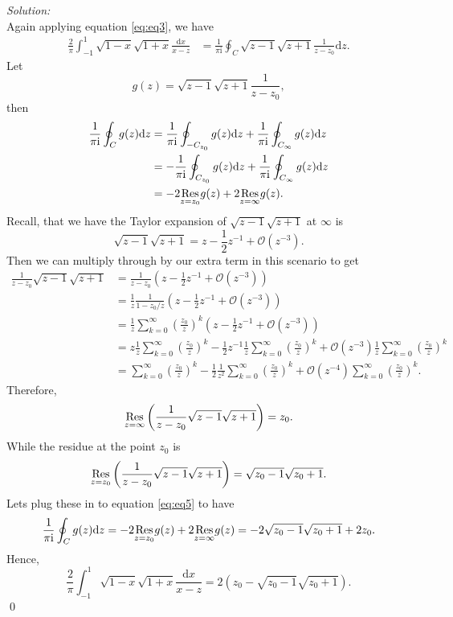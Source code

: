 \documentclass[10pt]{amsart}
\newcommand{\D}{\mathrm{d}}
\newcommand{\I}{\mathrm{i}}
\theoremstyle{nonumberplain}
\begin{document}
\begin{enumerate}[label={\bf {\arabic*}:}]
\begin{enumerate}
\textit{Solution:} \\
Again applying equation \eqref{eq:eq3}, we have
\begin{align*}
\frac{2}{\pi}\int_{-1}^1 {\sqrt{1-x} \sqrt{1 + x}} \frac{\D x}{x -z}
	&= \frac 1 {\pi \I} \oint_C \sqrt {z - 1} \sqrt {z + 1} \frac 1 {z - z_0} \D z.
\end{align*}
Let
$$g(z) = \sqrt {z - 1} \sqrt {z + 1} \frac 1 {z - z_0},$$
then
\begin{align}
\frac 1 {\pi \I} \oint_C g(z) \D z
	&= \frac 1 {\pi \I} \oint_{-C_{z_0}} g(z) \D z + \frac 1 {\pi \I} \oint_{C_\infty} g(z) \D z \nonumber \\
	&= - \frac 1 {\pi \I} \oint_{C_{z_0}} g(z) \D z + \frac 1 {\pi \I} \oint_{C_\infty} g(z) \D z \nonumber \\
	&= - 2 \underset{z=z_0}{{\rm Res}} g(z) + 2 \underset{z=\infty}{{\rm Res}} g(z).
\label{eq:eq5}
\end{align}
Recall, that we have the Taylor expansion of $\sqrt {z - 1} \sqrt {z + 1}$ at $\infty$ is
$$
\sqrt {z - 1} \sqrt {z + 1} = z - \frac 1 2 z^{-1} + \mathcal O(z^{-3}).
$$
Then we can multiply through by our extra term in this scenario to get
\begin{align*}
\frac 1 {z - z_0}\sqrt {z - 1} \sqrt {z + 1} &= \frac 1 {z - z_0} \left(z - \frac 1 2 z^{-1} + \mathcal O(z^{-3})\right) \\
	&= \frac 1 z \frac 1 {1 - z_0/z} \left(z - \frac 1 2 z^{-1} + \mathcal O(z^{-3})\right) \\
	&= \frac 1 z \sum_{k = 0}^\infty \left(\frac {z_0} z\right)^k \left(z - \frac 1 2 z^{-1} + \mathcal O(z^{-3})\right) \\
	&=  z\frac 1 z \sum_{k = 0}^\infty \left(\frac {z_0} z\right)^k - \frac 1 2 z^{-1}\frac 1 z \sum_{k = 0}^\infty \left(\frac {z_0} z\right)^k + \mathcal O(z^{-3})\frac 1 z \sum_{k = 0}^\infty \left(\frac {z_0} z\right)^k \\
	&= \sum_{k = 0}^\infty \left(\frac {z_0} z\right)^k - \frac 1 2 \frac 1 {z^2} \sum_{k = 0}^\infty \left(\frac {z_0} z\right)^k + \mathcal O(z^{-4}) \sum_{k = 0}^\infty \left(\frac {z_0} z\right)^k.
\end{align*}
Therefore,
$$
\underset{z=\infty}{{\rm Res}} \left( \frac 1 {z - z_0}\sqrt {z - 1} \sqrt {z + 1} \right) = z_0.
$$
While the residue at the point $z_0$ is 
$$
\underset{z=z_0}{{\rm Res}} \left( \frac 1 {z - z_0} \sqrt {z - 1} \sqrt {z + 1} \right) = \sqrt {z_0 - 1} \sqrt {z_0 + 1}.
$$
Lets plug these in to equation \eqref{eq:eq5} to have
\begin{align*}
\frac 1 {\pi \I} \oint_C g(z) \D z
	= - 2 \underset{z=z_0}{{\rm Res}} g(z) + 2 \underset{z=\infty}{{\rm Res}} g(z)
	=  - 2 \sqrt {z_0 - 1} \sqrt {z_0 + 1} + 2z_0.
\end{align*}
Hence,
$$
\frac{2}{\pi}\int_{-1}^1 {\sqrt{1-x} \sqrt{1 + x}} \frac{\D x}{x -z} = 2 (z_0 - \sqrt {z_0 - 1} \sqrt {z_0 + 1}).
$$
\qed \\

\end{enumerate}

      
    


  
\end{enumerate}
\end{document}

